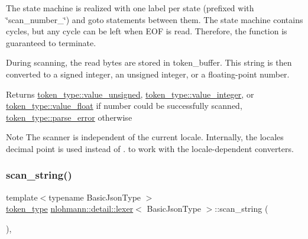 The state machine is realized with one label per state (prefixed with \char`\"{}scan\+\_\+number\+\_\+\char`\"{}) and {\ttfamily goto} statements between them. The state machine contains cycles, but any cycle can be left when E\+OF is read. Therefore, the function is guaranteed to terminate.

During scanning, the read bytes are stored in token\+\_\+buffer. This string is then converted to a signed integer, an unsigned integer, or a floating-\/point number.

\begin{DoxyReturn}{Returns}
\mbox{\hyperlink{classnlohmann_1_1detail_1_1lexer_a3f313cdbe187cababfc5e06f0b69b098aaf1f040fcd2f674d2e5893d7a731078f}{token\+\_\+type\+::value\+\_\+unsigned}}, \mbox{\hyperlink{classnlohmann_1_1detail_1_1lexer_a3f313cdbe187cababfc5e06f0b69b098a5064b6655d88a50ae16665cf7751c0ee}{token\+\_\+type\+::value\+\_\+integer}}, or \mbox{\hyperlink{classnlohmann_1_1detail_1_1lexer_a3f313cdbe187cababfc5e06f0b69b098a0d2671a6f81efb91e77f6ac3bdb11443}{token\+\_\+type\+::value\+\_\+float}} if number could be successfully scanned, \mbox{\hyperlink{classnlohmann_1_1detail_1_1lexer_a3f313cdbe187cababfc5e06f0b69b098a456e19aeafa334241c7ff3f589547f9d}{token\+\_\+type\+::parse\+\_\+error}} otherwise
\end{DoxyReturn}
\begin{DoxyNote}{Note}
The scanner is independent of the current locale. Internally, the locale\textquotesingle{}s decimal point is used instead of {\ttfamily .} to work with the locale-\/dependent converters. 
\end{DoxyNote}
\mbox{\label{classnlohmann_1_1detail_1_1lexer_ad271045d1c91df9d6a119482b4aeae7f}} 
\subsubsection{\texorpdfstring{scan\+\_\+string()}{scan\_string()}}
{\footnotesize\ttfamily template$<$typename Basic\+Json\+Type $>$ \\
\mbox{\hyperlink{classnlohmann_1_1detail_1_1lexer_a3f313cdbe187cababfc5e06f0b69b098}{token\+\_\+type}} \mbox{\hyperlink{classnlohmann_1_1detail_1_1lexer}{nlohmann\+::detail\+::lexer}}$<$ Basic\+Json\+Type $>$\+::scan\+\_\+string (\begin{DoxyParamCaption}{ }\end{DoxyParamCaption})\hspace{0.3cm}{\ttfamily [inline]}, {\ttfamily [private]}}



